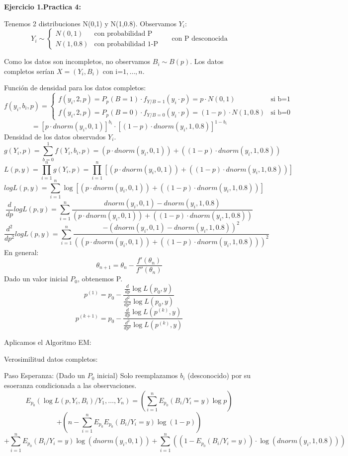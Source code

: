\textbf{Ejercicio 1.Practica 4:}

Tenemos 2 distribuciones N(0,1) y N(1,0.8). Observamos $Y_i$:
\[
Y_i \sim \left\{
    \begin{matrix}
        N(0,1) & \text{con probabilidad P}\\
        N(1,0.8) & \text{con probabilidad 1-P}
    \end{matrix}
\right.\
\quad
\text{ con P desconocida}
\]

Como los datos son incompletos, no observamos $B_i \sim B(p)$. Los datos completos serían $X=(Y_i,B_i)$ con i=$1,\dots,n$.

Función de densidad para los datos completos:
\[
f(y_i,b_i,p)=\left\{
    \begin{matrix}
        f(y_i,2,p)=P_p(B=1) \cdot f_{Y/B=1}(y_i \cdot p)= p \cdot N(0,1) & \text{si b=1}\\
        f(y_i,2,p)=P_p(B=0) \cdot f_{Y/B=0}(y_i \cdot p)= (1-p) \cdot N(1,0.8) & \text{si b=0}
    \end{matrix}
\right.\
\]
\[
=[p \cdot dnorm(y_i,0,1)]^{b_i} \cdot [(1-p) \cdot dnorm(y_i,1,0.8)]^{1-b_i}
\]
Densidad de los datos observados $Y_i$.
\[
g(Y_i,p)=\sum_{b=0}^{1} f(Y_i,b_i,p)=(p \cdot dnorm(y_i,0,1)) + ((1-p) \cdot dnorm(y_i,1,0.8))
\]
\[
L(p,y)=\prod_{i=1}^{n} g(Y_i,p)=\prod_{i=1}^{n} [(p \cdot dnorm(y_i,0,1)) + ((1-p) \cdot dnorm(y_i,1,0.8))]
\]
\[
log L(p,y)=\sum_{i=1}^{n} \log [(p \cdot dnorm(y_i,0,1)) + ((1-p) \cdot dnorm(y_i,1,0.8))]
\]
\[
\frac{d}{dp} log L(p,y)= \sum_{i=1}^{n} \frac{dnorm(y_i,0,1)-dnorm(y_i,1,0.8)}{(p \cdot dnorm(y_i,0,1)) + ((1-p) \cdot dnorm(y_i,1,0.8))}
\]
\[
\frac{d^2}{dp^2} log L(p,y)= \sum_{i=1}^{n} \frac{-(dnorm(y_i,0,1)-dnorm(y_i,1,0.8))^2}{((p \cdot dnorm(y_i,0,1)) + ((1-p) \cdot dnorm(y_i,1,0.8)))^2}
\]
En general:
\[
\theta_{n+1}=\theta_n
-\frac{f'(\theta_n)}{f''(\theta_n)}\]
\newpage
Dado un valor inicial $P_0$, obtenemos P.
\[
p^{(1)}=p_0-\frac{\frac{d}{dp}\log L(p_0,y)}{\frac{d^2}{dp^2}\log L(p_0,y)}
\]
\[
p^{(k+1)}=p_0-\frac{\frac{d}{dp}\log L(p^{(k)},y)}{\frac{d^2}{dp^2}\log L(p^{(k)},y)}
\]

Aplicamos el Algoritmo EM:

Verosimilitud datos completos:

Paso Esperanza: (Dado un $P_0$ inicial) Solo reemplazamos $b_i$ (desconocido) por su esoeranza condicionada a las observaciones.
\[
E_{p_0}(\log L(p,Y_i,B_i)/Y_1,\dots,Y_n)=(\sum_{i=1}^{n} E_{p_0}(B_i/Y_i=y) \log p)
\]\[
+(n-\sum_{i=1}^{n} E_{p_0} E_{p_0}(B_i/Y_i=y) \log (1-p))
\]\[
+\sum_{i=1}^{n} E_{p_0}(B_i/Y_i=y) \log(dnorm(y_i,0,1))+ \sum_{i=1}^{n} ((1-E_{p_0}(B_i/Y_i=y))\cdot \log(dnorm(y_i,1,0.8)))
\]

